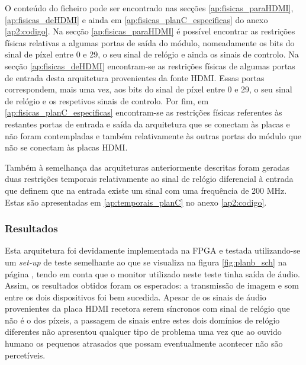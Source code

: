 O conteúdo do ficheiro pode ser encontrado nas secções \ref{ap:fisicas_paraHDMI}, \ref{ap:fisicas_deHDMI} e ainda em \ref{ap:fisicas_planC_especificas} do anexo \ref{ap2:codigo}. Na secção \ref{ap:fisicas_paraHDMI} é possível encontrar as restrições físicas relativas a algumas portas de saída do módulo, nomeadamente os bits do sinal de píxel entre 0 e 29, o seu sinal de relógio e ainda os sinais de controlo. Na secção \ref{ap:fisicas_deHDMI} encontram-se as restrições físicas de algumas portas de entrada desta arquitetura provenientes da fonte HDMI. Essas portas correspondem, mais uma vez, aos bits do sinal de píxel entre 0 e 29, o seu sinal de relógio e os respetivos sinais de controlo. Por fim, em \ref{ap:fisicas_planC_especificas} encontram-se as restrições físicas referentes às restantes portas de entrada e saída da arquitetura que se conectam às placas e não foram contempladas e também relativamente às outras portas do módulo que não se conectam às placas HDMI. 

Também à semelhança das arquiteturas anteriormente descritas foram geradas duas restrições temporais relativamente ao sinal de relógio diferencial à entrada que definem que na entrada existe um sinal com uma frequência de 200 MHz. Estas são apresentadas em \ref{ap:temporais_planC} no anexo \ref{ap2:codigo}.

\subsubsection*{Resultados}

Esta arquitetura foi devidamente implementada na FPGA e testada utilizando-se um \textit{set-up} de teste semelhante ao que se visualiza na figura \ref{fig:planb_sch} na página \pageref{fig:planb_sch}, tendo em conta que o monitor utilizado neste teste tinha saída de áudio. Assim, os resultados obtidos foram os esperados: a transmissão de imagem e som entre os dois dispositivos foi bem sucedida. Apesar de os sinais de áudio provenientes da placa HDMI recetora serem síncronos com sinal de relógio que não é o dos píxeis, a passagem de sinais entre estes dois domínios de relógio diferentes não apresentou qualquer tipo de problema uma vez que ao ouvido humano os pequenos atrasados que possam eventualmente acontecer não são percetíveis. 